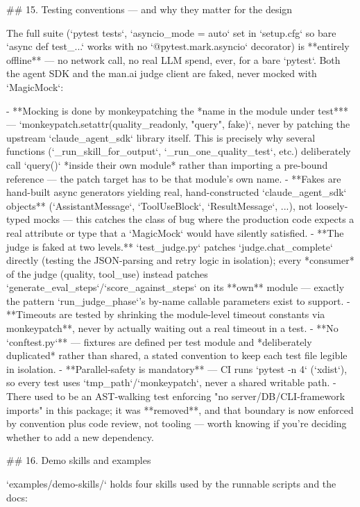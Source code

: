 ## 15. Testing conventions — and why they matter for the design

The full suite (`pytest tests`, `asyncio_mode = auto` set in `setup.cfg` so bare `async def test_...` works with no `@pytest.mark.asyncio` decorator) is **entirely offline** — no network call, no real LLM spend, ever, for a bare `pytest`. Both the agent SDK and the man.ai judge client are faked, never mocked with `MagicMock`:

- **Mocking is done by monkeypatching the *name in the module under test*** — `monkeypatch.setattr(quality_readonly, "query", fake)`, never by patching the upstream `claude_agent_sdk` library itself. This is precisely why several functions (`_run_skill_for_output`, `_run_one_quality_test`, etc.) deliberately call `query()` *inside their own module* rather than importing a pre-bound reference — the patch target has to be that module's own name.
- **Fakes are hand-built async generators yielding real, hand-constructed `claude_agent_sdk` objects** (`AssistantMessage`, `ToolUseBlock`, `ResultMessage`, ...), not loosely-typed mocks — this catches the class of bug where the production code expects a real attribute or type that a `MagicMock` would have silently satisfied.
- **The judge is faked at two levels.** `test_judge.py` patches `judge.chat_complete` directly (testing the JSON-parsing and retry logic in isolation); every *consumer* of the judge (quality, tool_use) instead patches `generate_eval_steps`/`score_against_steps` on its **own** module — exactly the pattern `run_judge_phase`'s by-name callable parameters exist to support.
- **Timeouts are tested by shrinking the module-level timeout constants via monkeypatch**, never by actually waiting out a real timeout in a test.
- **No `conftest.py`** — fixtures are defined per test module and *deliberately duplicated* rather than shared, a stated convention to keep each test file legible in isolation.
- **Parallel-safety is mandatory** — CI runs `pytest -n 4` (`xdist`), so every test uses `tmp_path`/`monkeypatch`, never a shared writable path.
- There used to be an AST-walking test enforcing "no server/DB/CLI-framework imports" in this package; it was **removed**, and that boundary is now enforced by convention plus code review, not tooling — worth knowing if you're deciding whether to add a new dependency.

## 16. Demo skills and examples

`examples/demo-skills/` holds four skills used by the runnable scripts and the docs:

